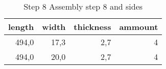 \begin{table}[h!]
\centering
\caption{Step 8 Assembly step 8 and sides}
\begin{tabular}{rrrr}
\toprule
 length &  width &  thickness &  ammount \\
\midrule
  494,0 &   17,3 &        2,7 &        4 \\
  494,0 &   20,0 &        2,7 &        4 \\
\bottomrule
\end{tabular}
\end{table}
